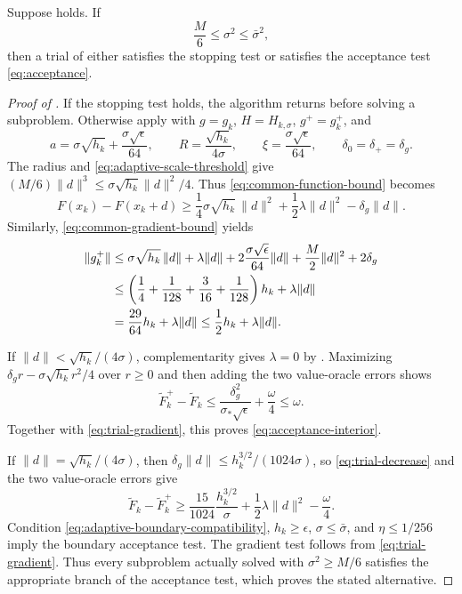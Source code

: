 \documentclass{article}
\begin{document}
\begin{lemma}\label{lem:large-scale}
Suppose  holds.  If
\begin{equation}\label{eq:adaptive-scale-threshold}
 \frac{M}{6}\le\sigma^2\le\bar\sigma^2,
\end{equation}
then a trial of  either satisfies the stopping
test or satisfies the acceptance test \eqref{eq:acceptance}.
\end{lemma}

\begin{proof}[Proof of ]
If the stopping test holds, the algorithm returns before solving a
subproblem.  Otherwise apply  with
$g=g_k$, $H=H_{k,\sigma}$, $g^+=g_k^+$, and
\[
 a=\sigma\sqrt{h_k}+\frac{\sigma\sqrt\epsilon}{64},\qquad
 R=\frac{\sqrt{h_k}}{4\sigma},\qquad
 \xi=\frac{\sigma\sqrt\epsilon}{64},\qquad
 \delta_0=\delta_+=\delta_g.
\]
The radius and
\eqref{eq:adaptive-scale-threshold} give
$(M/6)\|d\|^3\le\sigma\sqrt{h_k}\|d\|^2/4$.
Thus \eqref{eq:common-function-bound} becomes
\begin{equation}\label{eq:trial-decrease}
    F(x_k)-F(x_k+d)
    \ge\frac14\sigma\sqrt{h_k}\,\|d\|^2
       +\frac12\lambda\|d\|^2-\delta_g\|d\|.
\end{equation}
Similarly, \eqref{eq:common-gradient-bound} yields
\begin{align}
\|g_k^+\|
&\le \sigma\sqrt{h_k}\,\|d\|+\lambda\|d\|
 +2\frac{\sigma\sqrt\epsilon}{64}\|d\|
 +\frac M2\|d\|^2+2\delta_g \notag\\
&\le\left(\frac14+\frac1{128}+\frac3{16}
 +\frac1{128}\right)h_k+\lambda\|d\| \notag\\
&=\frac{29}{64}h_k+\lambda\|d\|
 \le\frac12h_k+\lambda\|d\|. \label{eq:trial-gradient}
\end{align}

If $\|d\|<\sqrt{h_k}/(4\sigma)$, complementarity gives
$\lambda=0$ by .  Maximizing
$\delta_g r-\sigma\sqrt{h_k}r^2/4$ over $r\ge0$ and then adding the
two value-oracle errors shows
\[
 \widetilde F_k^+-\widetilde F_k
 \le\frac{\delta_g^2}{\sigma_*\sqrt\epsilon}+\frac\omega4
 \le\omega.
\]
Together with \eqref{eq:trial-gradient}, this proves
\eqref{eq:acceptance-interior}.

If $\|d\|=\sqrt{h_k}/(4\sigma)$, then
$\delta_g\|d\|\le h_k^{3/2}/(1024\sigma)$, so
\eqref{eq:trial-decrease} and the two value-oracle errors give
\[
 \widetilde F_k-\widetilde F_k^+
 \ge\frac{15}{1024}\frac{h_k^{3/2}}\sigma
 +\frac12\lambda\|d\|^2-\frac\omega4.
\]
Condition \eqref{eq:adaptive-boundary-compatibility}, $h_k\ge\epsilon$,
$\sigma\le\bar\sigma$, and $\eta\le1/256$ imply the boundary
acceptance test.  The gradient test follows from
\eqref{eq:trial-gradient}.
Thus every subproblem actually solved with
$\sigma^2\ge M/6$ satisfies the appropriate branch of the acceptance
test, which proves the stated alternative.
\end{proof}
\end{document}
